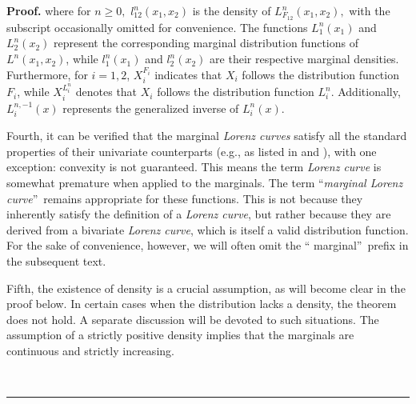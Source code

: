 \documentclass[onecolumn]{article}
\newenvironment{proof}[1][Proof]{\noindent\textbf{#1.} }{\ \rule{0.5em}{0.5em}}
\begin{document}
\begin{proof}
where for $n\geq 0,$ $l_{12}^{n}(x_{1},x_{2})$ is the density of $%
L_{F_{12}}^{n}(x_{1},x_{2}),$ with the subscript occasionally omitted for
convenience. The functions $L_{1}^{n}(x_{1})$ and $L_{2}^{n}(x_{2})$
represent the corresponding marginal distribution functions of $%
L^{n}(x_{1},x_{2})$, while $l_{1}^{n}(x_{1})$ and $l_{2}^{n}(x_{2})$ are
their respective marginal densities. Furthermore, for $i=1,2$, $%
X_{i}^{F_{i}} $ indicates that $X_{i}$ follows the distribution function $%
F_{i}$, while $X_{i}^{L_{i}^{n}}$ denotes that $X_{i}$ follows the
distribution function $L_{i}^{n}$. Additionally, $L_{i}^{n,-1}(x)$
represents the generalized inverse of $L_{i}^{n}(x)$.

Fourth, it can be verified that the marginal \textit{Lorenz curves} satisfy
all the standard properties of their univariate counterparts (e.g., as
listed in \cite{[2]} and \cite{[10]}), with one exception: convexity is not
guaranteed. This means the term \textit{Lorenz curve} is somewhat premature
when applied to the marginals. The term \textquotedblleft \textit{marginal
Lorenz curve}\textquotedblright\ remains appropriate for these functions.
This is not because they inherently satisfy the definition of a \textit{%
Lorenz curve}, but rather because they are derived from a bivariate \textit{%
Lorenz curve}, which is itself a valid distribution function. For the sake
of convenience, however, we will often omit the \textquotedblleft
marginal\textquotedblright\ prefix in the subsequent text.

Fifth, the existence of density is a crucial assumption, as will become
clear in the proof below. In certain cases when the distribution lacks a
density, the theorem does not hold. A separate discussion will be devoted to
such situations. The assumption of a strictly positive density implies that
the marginals are continuous and strictly increasing.


\end{proof}
\end{document}
